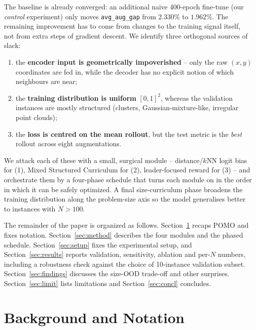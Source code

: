 \documentclass[11pt,a4paper]{article}
\begin{document}
The baseline is already converged: an additional naive 400-epoch fine-tune
(our \emph{control} experiment) only moves \texttt{avg\_aug\_gap} from $2.330\%$
to $1.962\%$. The remaining improvement has to come from changes to the
training signal itself, not from extra steps of gradient descent. We
identify three orthogonal sources of slack:
%
\begin{enumerate}
  \item the \textbf{encoder input is geometrically impoverished} -- only the
        raw $(x,y)$ coordinates are fed in, while the decoder has no explicit
        notion of which neighbours are near;
  \item the \textbf{training distribution is uniform} $[0,1]^2$, whereas
        the validation instances are mostly structured (clusters,
        Gaussian-mixture-like, irregular point clouds);
  \item the \textbf{loss is centred on the mean rollout}, but the test metric
        is the \emph{best} rollout across eight augmentations.
\end{enumerate}
%
We attack each of these with a small, surgical module --
distance/$k$NN logit bias for (1), Mixed Structured Curriculum for (2),
leader-focused reward for (3) -- and orchestrate them by a four-phase
schedule that turns each module on in the order in which it can be safely
optimized. A final size-curriculum phase broadens the
training distribution along the problem-size axis so the model generalises
better to instances with $N>100$.

The remainder of the paper is organized as follows. Section~\ref{sec:bg}
recaps POMO and fixes notation. Section~\ref{sec:method} describes the four
modules and the phased schedule. Section~\ref{sec:setup} fixes the
experimental setup, and Section~\ref{sec:results} reports validation,
sensitivity, ablation and per-$N$ numbers, including a robustness check
against the choice of 10-instance validation subset.
Section~\ref{sec:findings} discusses the size-OOD trade-off and other
surprises. Section~\ref{sec:limit} lists limitations and Section~\ref{sec:concl}
concludes.

\section{Background and Notation}
\label{sec:bg}
\end{document}
